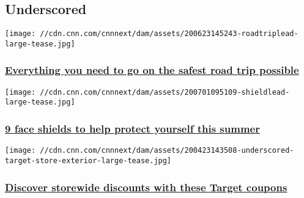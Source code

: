 \hypertarget{underscored-}{%
\subsection{Underscored~}\label{underscored-}}

\href{/2020/06/26/cnn-underscored/road-trip-ideas-safe-travel/index.html}{}

\texttt{[image: //cdn.cnn.com/cnnnext/dam/assets/200623145243-roadtriplead-large-tease.jpg]}

\hypertarget{everything-you-need-to-go-on-the-safest-road-trip-possible}{%
\subsubsection{\texorpdfstring{\href{/2020/06/26/cnn-underscored/road-trip-ideas-safe-travel/index.html}{Everything
you need to go on the safest road trip
possible}}{Everything you need to go on the safest road trip possible}}\label{everything-you-need-to-go-on-the-safest-road-trip-possible}}

\href{/2020/07/09/cnn-underscored/best-face-shields-outbrain/index.html}{}

\texttt{[image: //cdn.cnn.com/cnnnext/dam/assets/200701095109-shieldlead-large-tease.jpg]}

\hypertarget{9-face-shields-to-help-protect-yourself-this-summer-}{%
\subsubsection{\texorpdfstring{\href{/2020/07/09/cnn-underscored/best-face-shields-outbrain/index.html}{9
face shields to help protect yourself this summer
}}{9 face shields to help protect yourself this summer }}\label{9-face-shields-to-help-protect-yourself-this-summer-}}

\href{https://coupons.cnn.com/target}{}

\texttt{[image: //cdn.cnn.com/cnnnext/dam/assets/200423143508-underscored-target-store-exterior-large-tease.jpg]}

\hypertarget{discover-storewide-discounts-with-these-target-coupons}{%
\subsubsection{\texorpdfstring{\href{https://coupons.cnn.com/target}{Discover
storewide discounts with these Target
coupons}}{Discover storewide discounts with these Target coupons}}\label{discover-storewide-discounts-with-these-target-coupons}}

